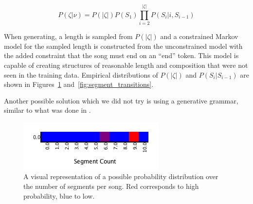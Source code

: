 \documentclass[letterpaper]{article}
\begin{document}
\[ P(\zeta|\nu) = P(|\zeta|) P(S_1) \prod_{i=2}^{|\zeta|} P(S_i|i,S_{i-1}) \]

When generating, a length is sampled from $P(|\zeta|)$ and a constrained Markov model for the sampled length is constructed from the unconstrained model with the added constraint that the song must end on an ``end'' token. This model is capable of creating structures of reasonable length and composition that were not seen in the training data. Empirical distributions of $P(|\zeta|)$ and $P(S_i|S_{i-1})$ are shown in Figures~\ref{fig:segment_count_per_song} and~\ref{fig:segment_transitions}.

Another possible solution which we did not try is using a generative grammar, similar to what was done in \cite{steedman1984generative}.

\begin{figure}
	\centering
	\includegraphics[width=\linewidth]{segment_count_per_song}
	\caption{\label{fig:segment_count_per_song} A visual representation of a possible probability distribution over the number of segments per song. Red corresponds to high probability, blue to low.}
\end{figure}
\end{document}
